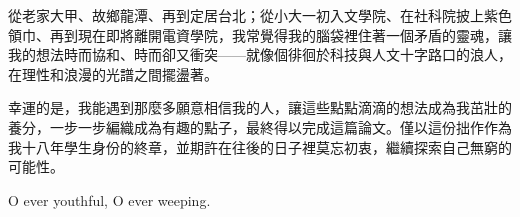 \begin{acknowledgement}
從老家大甲、故鄉龍潭、再到定居台北；從小大一初入文學院、在社科院披上紫色領巾、再到現在即將離開電資學院，我常覺得我的腦袋裡住著一個矛盾的靈魂，讓我的想法時而協和、時而卻又衝突——就像個徘徊於科技與人文十字路口的浪人，在理性和浪漫的光譜之間擺盪著。

幸運的是，我能遇到那麼多願意相信我的人，讓這些點點滴滴的想法成為我茁壯的養分，一步一步編織成為有趣的點子，最終得以完成這篇論文。僅以這份拙作作為我十八年學生身份的終章，並期許在往後的日子裡莫忘初衷，繼續探索自己無窮的可能性。

O ever youthful, O ever weeping.



\end{acknowledgement}